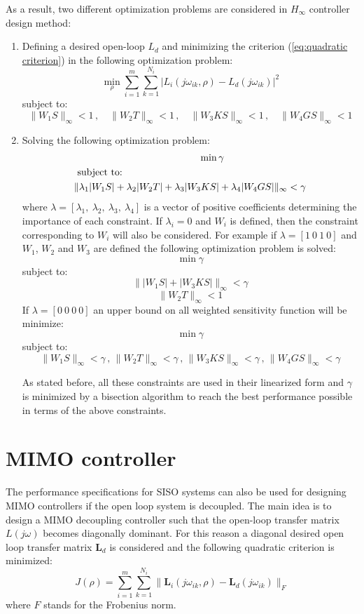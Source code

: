 \documentclass [12pt , a4paper] {report}
\begin{document}
As a result, two different optimization problems are considered in $H_\infty$ controller design method:
\begin{enumerate} 
\item Defining a desired open-loop $L_d$ and minimizing the criterion (\ref{eq:quadratic criterion}) in the following optimization problem:
\[
\min_\rho{\sum_{i=1}^{m}\sum_{k=1}^{N_i} |L_i(j\omega_{ik},\rho)-L_d(j\omega_{ik})|^2}
\]
subject to:
$$
 \|W_1S\|_\infty<1 \, , \quad
 \|W_2T\|_\infty<1 \, , \quad
 \|W_3KS\|_\infty<1  \, , \quad
 \|W_4GS\|_\infty<1 
$$

\item Solving the following optimization problem:
\begin{equation}
\begin{split}
& \hspace{4.5cm}\min{\gamma} \\
&\mbox{ subject to: } \\
&\| \lambda_1 |W_1S| + \lambda_2 |W_2 T| + \lambda_3 |W_3 KS| + \lambda_4 |W_4 GS|  \|_\infty < \gamma
\end{split}
\label{gamma_optim}
\end{equation}
where $\lambda=[\lambda_1, \: \lambda_2, \: \lambda_3, \: \lambda_4]$ is a vector of positive coefficients determining the importance of each constraint. If $\lambda_i=0$ and $W_i$ is defined, then the constraint corresponding to $W_i$ will also be considered. For example if $\lambda=[1 \: 0 \:1 \:0]$ and $W_1$, $W_2$ and $W_3$ are defined the following optimization problem is solved:
\[
\min{\gamma}
\]
subject to:
$$\|  |W_1S| + |W_3 KS|  \|_\infty < \gamma$$
$$
 \|W_2T\|_\infty<1 
$$
If $\lambda=[0 \: 0 \:0 \:0]$ an upper bound on all weighted sensitivity function will be minimize:
\[
\min{\gamma}
\]
subject to:
$$\| W_1S \|_\infty < \gamma  \, , \,  \|W_2T\|_\infty< \gamma  \, , \,   \| W_3KS \|_\infty < \gamma   \, , \,  \|W_4GS\|_\infty< \gamma$$

As stated before, all these constraints are used in their linearized form and  $\gamma$ is minimized by a bisection algorithm to reach the best performance possible in terms of the above constraints. 

\end{enumerate}

\section{MIMO controller}
The performance specifications for SISO systems can also be used for designing MIMO controllers if the open loop system is decoupled. The main idea is to design a MIMO decoupling controller such that the open-loop transfer matrix $L(j\omega)$ becomes diagonally dominant. For this reason a diagonal desired open loop transfer matrix $\textbf{L}_d$ is considered and the following quadratic criterion is minimized:
\begin{equation}
\label{eq:L-LD}
J(\rho)=\sum_{i=1}^{m}\sum_{k=1}^{N_i} \| \textbf{L}_i(j\omega_{ik},\rho)- \textbf{L}_d(j\omega_{ik}) \|_F
\end{equation}
where $F$ stands for the Frobenius norm.
\end{document}

